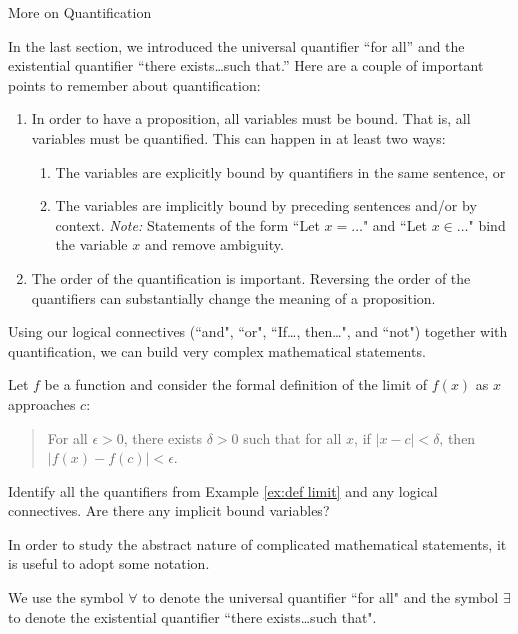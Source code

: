\begin{section}{More on Quantification}

In the last section, we introduced the universal quantifier ``for all'' and the existential quantifier ``there exists\ldots such that.''  Here are a couple of important points to remember about quantification:
\begin{enumerate}
\item In order to have a proposition, all variables must be bound.  That is, all variables must be quantified.  This can happen in at least two ways:
\begin{enumerate}
\item The variables are explicitly bound by quantifiers in the same sentence, or
\item The variables are implicitly bound by preceding sentences and/or by context.  \emph{Note:}  Statements of the form ``Let $x=\ldots$" and ``Let $x\in\ldots$" bind the variable $x$ and remove ambiguity.
\end{enumerate}
\item The order of the quantification is important.  Reversing the order of the quantifiers can substantially change the meaning of a proposition.
\end{enumerate}

Using our logical connectives (``and", ``or", ``If\ldots, then\ldots", and ``not") together with quantification, we can build very complex mathematical statements.

\begin{example}\label{ex:def limit}
Let $f$ be a function and consider the formal definition of the limit of $f(x)$ as $x$ approaches $c$:

\begin{quote}
For all $\epsilon >0$, there exists $\delta >0$ such that for all $x$, if $|x-c|<\delta$, then $|f(x)-f(c)|<\epsilon$.
\end{quote}
\end{example}

\begin{exercise}
Identify all the quantifiers from Example \ref{ex:def limit} and any logical connectives.  Are there any implicit bound variables?
\end{exercise}

In order to study the abstract nature of complicated mathematical statements, it is useful to adopt some notation.

\begin{definition}
We use the symbol $\forall$ to denote the universal quantifier ``for all" and the symbol $\exists$ to denote the existential quantifier ``there exists\ldots such that".
\end{definition}


\end{section}
